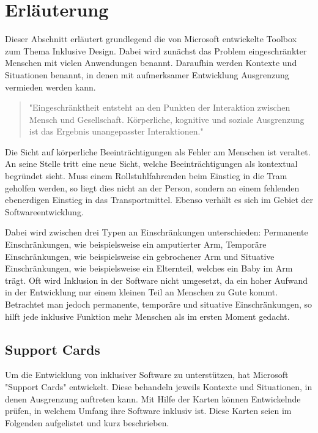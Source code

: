 \section{Erläuterung}

Dieser Abschnitt erläutert grundlegend die von Microsoft entwickelte Toolbox zum Thema Inklusive Design.
Dabei wird zunächst das Problem eingeschränkter Menschen mit vielen Anwendungen benannt.
Daraufhin werden Kontexte und Situationen benannt, in denen mit aufmerksamer Entwicklung Ausgrenzung vermieden werden kann.

\begin{quote}
"Eingeschränktheit entsteht an den Punkten der Interaktion zwischen Mensch und Gesellschaft.
Körperliche, kognitive und soziale Ausgrenzung ist das Ergebnis unangepasster Interaktionen." \cite{ITToolkit}
\end{quote}

Die Sicht auf körperliche Beeinträchtigungen als Fehler am Menschen ist veraltet.
An seine Stelle tritt eine neue Sicht, welche Beeinträchtigungen als kontextual begründet sieht.
Muss einem Rollstuhlfahrenden beim Einstieg in die Tram geholfen werden, so liegt dies nicht an der Person, sondern an einem fehlenden ebenerdigen Einstieg in das Transportmittel.
Ebenso verhält es sich im Gebiet der Softwareentwicklung.

Dabei wird zwischen drei Typen an Einschränkungen unterschieden:
Permanente Einschränkungen, wie beispielsweise ein amputierter Arm, Temporäre Einschränkungen, wie beispielsweise ein gebrochener Arm und Situative Einschränkungen, wie beispielsweise ein Elternteil, welches ein Baby im Arm trägt.
Oft wird Inklusion in der Software nicht umgesetzt, da ein hoher Aufwand in der Entwicklung nur einem kleinen Teil an Menschen zu Gute kommt.
Betrachtet man jedoch permanente, temporäre und situative Einschränkungen, so hilft jede inklusive Funktion mehr Menschen als im ersten Moment gedacht.

\subsection{Support Cards}

Um die Entwicklung von inklusiver Software zu unterstützen, hat Microsoft "Support Cards" entwickelt.
Diese behandeln jeweils Kontexte und Situationen, in denen Ausgrenzung auftreten kann.
Mit Hilfe der Karten können Entwickelnde prüfen, in welchem Umfang ihre Software inklusiv ist.
Diese Karten seien im Folgenden aufgelistet und kurz beschrieben.

